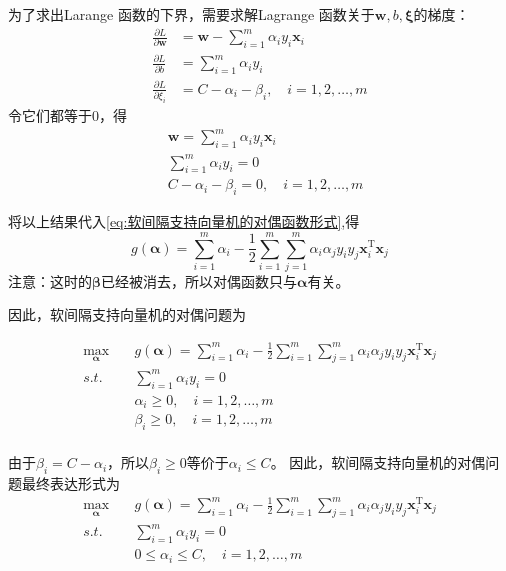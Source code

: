 \documentclass[withoutpreface,bwprint]{NoteBook}
\begin{document}
为了求出Larange 函数的下界，需要求解Lagrange 函数关于$\mathbf{w},b,\bm{\xi}$的梯度：
\begin{align}
    \label{eq:软间隔支持向量机的Lagrange函数梯度}
    \frac{\partial L}{\partial \mathbf{w}} &= \mathbf{w} - \sum_{i=1}^{m} \alpha_i y_i \mathbf{x}_i \\
    \frac{\partial L}{\partial b} &= \sum_{i=1}^{m} \alpha_i y_i \\
    \frac{\partial L}{\partial \xi_i} &= C - \alpha_i - \beta_i, \quad i=1,2,\dots,m
\end{align}
令它们都等于0，得
\begin{align}
    & \mathbf{w} = \sum_{i=1}^{m} \alpha_i y_i \mathbf{x}_i \\
    & \sum_{i=1}^{m} \alpha_i y_i = 0 \\
    & C - \alpha_i - \beta_i = 0, \quad i=1,2,\dots,m
\end{align}

将以上结果代入\cref{eq:软间隔支持向量机的对偶函数形式},得
\begin{equation}
    \label{eq:软间隔支持向量机的对偶函数}
    g(\bm{\alpha}) 
    = \sum_{i=1}^{m} \alpha_i - \frac{1}{2} \sum_{i=1}^{m} \sum_{j=1}^{m} \alpha_i \alpha_j y_i y_j \mathbf{x}_i^\mathrm{T} \mathbf{x}_j
\end{equation}
注意：这时的$\bm{\beta}$已经被消去，所以对偶函数只与$\bm{\alpha}$有关。

因此，软间隔支持向量机的对偶问题为

\begin{equation}
    \label{eq:软间隔支持向量机的对偶问题初始表达形式}
    \begin{aligned}
        \max_{\bm{\alpha}} \quad & g(\bm{\alpha}) = \sum_{i=1}^{m} \alpha_i - \frac{1}{2} \sum_{i=1}^{m} \sum_{j=1}^{m} \alpha_i \alpha_j y_i y_j \mathbf{x}_i^\mathrm{T} \mathbf{x}_j \\
        s.t. \quad & \sum_{i=1}^{m} \alpha_i y_i = 0 \\
        & \alpha_i \geq 0, \quad i=1,2,\dots,m \\
        & \beta_i \geq 0, \quad i=1,2,\dots,m  \\
    \end{aligned}
\end{equation}

由于$ \beta_i = C - \alpha_i $，所以$ \beta_i \geq 0 $等价于$ \alpha_i \leq C $。
因此，软间隔支持向量机的对偶问题最终表达形式为
\begin{equation}
    \label{eq:软间隔支持向量机的对偶问题最终表达形式}
    \begin{aligned}
        \max_{\bm{\alpha}} \quad & g(\bm{\alpha}) = \sum_{i=1}^{m} \alpha_i - \frac{1}{2} \sum_{i=1}^{m} \sum_{j=1}^{m} \alpha_i \alpha_j y_i y_j \mathbf{x}_i^\mathrm{T} \mathbf{x}_j \\
        s.t. \quad & \sum_{i=1}^{m} \alpha_i y_i = 0 \\
        & 0 \leq \alpha_i \leq C, \quad i=1,2,\dots,m
    \end{aligned}
\end{equation}
\end{document}
